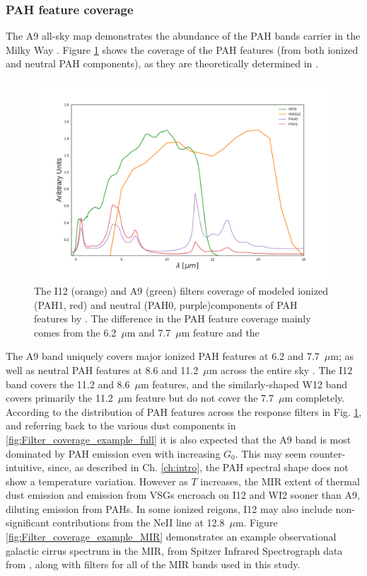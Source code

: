        \subsubsection{PAH feature coverage}
         The A9 all-sky map demonstrates the abundance of the PAH bands carrier in the Milky Way \citep{ishihara10}. Figure \ref{fig:Filter_coverage_example_PAH} shows the coverage of the PAH features (from both ionized and neutral PAH components), as they are theoretically determined in \cite{dustem11}.
            \begin{figure}
              \centering
              \includegraphics[width=\textwidth]{../Plots/ch_datasources/Filter_coverage_example_PAH.pdf}
              \caption{The I12 (orange) and A9 (green) filters coverage of modeled ionized (PAH1, red) and neutral (PAH0, purple)components of PAH features by \cite{dustem11}. The difference in the PAH feature coverage mainly comes from the 6.2~$\mu$m and 7.7~$\mu$m feature and the }
              \label{fig:Filter_coverage_example_PAH}
            \end{figure}
         The A9 band uniquely covers major ionized PAH features at 6.2 and 7.7~$\mu$m; as well as neutral PAH features at 8.6 and 11.2~$\mu$m across the entire sky \citep{irc07}. The I12 band covers the 11.2 and 8.6~$\mu$m features, and the similarly-shaped W12 band covers primarily the 11.2~$\mu{}$m feature but do not cover the 7.7~$\mu{}$m completely. According to the distribution of PAH features across the response filters in Fig. \ref{fig:Filter_coverage_example_PAH}, and referring back to the various dust components in \ref{fig:Filter_coverage_example_full} it is also expected that the A9 band is most dominated by PAH emission even with increasing $G_{0}$. This may seem counter-intuitive, since, as described in Ch. \ref{ch:intro}, the PAH spectral shape does not show a temperature variation. However as $T$ increases, the MIR extent of thermal dust emission and emission from VSGs encroach on I12 and WI2 sooner than A9, diluting emission from PAHs. In some ionized reigons, I12 may also include non-significant contributions from the NeII line at 12.8~$\mu$m. Figure \ref{fig:Filter_coverage_example_MIR} demonstrates an example observational galactic cirrus spectrum in the MIR, from Spitzer Infrared Spectrograph \citep{spitzer04} data from \cite{...}, along with filters for all of the MIR bands used in this study.
